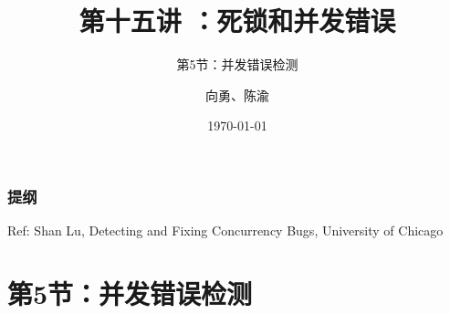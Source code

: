 


\title[第15讲]{第十五讲 ：死锁和并发错误} %
\subtitle{第5节：并发错误检测}
\author{向勇、陈渝} %
\date{\today} %



\begin{frame}
\titlepage %
\end{frame}

\begin{frame}
\frametitle{提纲} %
\tableofcontents %

Ref: Shan Lu, Detecting and Fixing Concurrency Bugs, University of Chicago

\end{frame}
\section{第5节：并发错误检测} %
